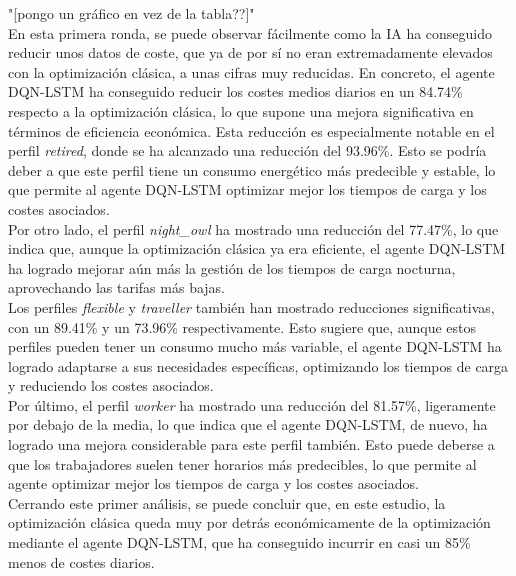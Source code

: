"[pongo un gráfico en vez de la tabla??]"\\

En esta primera ronda, se puede observar fácilmente como la IA ha conseguido reducir unos datos
de coste, que ya de por sí no eran extremadamente elevados con la optimización clásica, a unas 
cifras muy reducidas. En concreto, el agente DQN-LSTM ha conseguido reducir los costes
medios diarios en un 84.74\% respecto a la optimización clásica, lo que supone una mejora
significativa en términos de eficiencia económica. Esta reducción es especialmente notable en
el perfil \textit{retired}, donde se ha alcanzado una reducción del 93.96\%. Esto se podría deber 
a que este perfil tiene un consumo energético más predecible y estable, lo que permite al
agente DQN-LSTM optimizar mejor los tiempos de carga y los costes asociados.\\

Por otro lado, el perfil \textit{night\_owl} ha mostrado una reducción del 77.47\%, lo que indica que,
aunque la optimización clásica ya era eficiente, el agente DQN-LSTM ha logrado mejorar aún más
la gestión de los tiempos de carga nocturna, aprovechando las tarifas más bajas.\\

Los perfiles \textit{flexible} y \textit{traveller} también han mostrado reducciones significativas,
con un 89.41\% y un 73.96\% respectivamente. Esto sugiere que, aunque estos perfiles pueden tener
un consumo mucho más variable, el agente DQN-LSTM ha logrado adaptarse a sus necesidades específicas,
optimizando los tiempos de carga y reduciendo los costes asociados.\\

Por último, el perfil \textit{worker} ha mostrado una reducción del 81.57\%, ligeramente por debajo
de la media, lo que indica que el agente DQN-LSTM, de nuevo, ha logrado una mejora considerable 
para este perfil también. Esto puede deberse a que los trabajadores suelen tener horarios más
predecibles, lo que permite al agente optimizar mejor los tiempos de carga y los costes asociados.\\

Cerrando este primer análisis, se puede concluir que, en este estudio, la optimización clásica queda
muy por detrás económicamente de la optimización mediante el agente DQN-LSTM, que ha conseguido 
incurrir en casi un 85\% menos de costes diarios.

